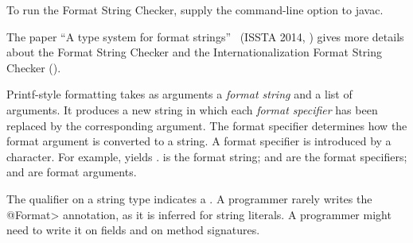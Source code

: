 \begin{sloppypar}
To run the Format String Checker, supply the
 command-line option to javac.
\end{sloppypar}

The paper ``A type system for format strings''~\cite{WeitzKSE2014} (ISSTA
2014,
)
gives more details about the Format String Checker and the Internationalization Format
String Checker ().



Printf-style formatting takes as arguments a \emph{format string} and a
list of arguments.  It produces a new string in which each \emph{format
  specifier} has been replaced by the corresponding argument.
The format specifier determines how the format argument is converted to a
string.
A format specifier is introduced by a \code{\%} character. For example,
 yields
.   is
the format string;  and  are the format specifiers;
 and  are format arguments.



The  qualifier on a string type
indicates a
.
A programmer rarely writes the \<@Format> annotation, as it is inferred for
string literals.  A programmer might need to write it on fields and on method
signatures.


